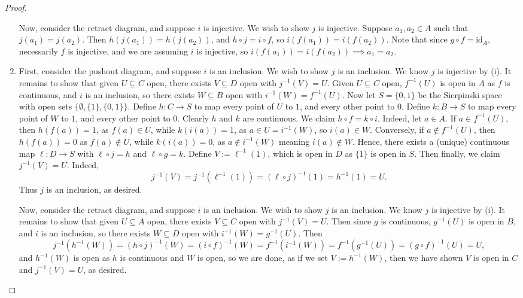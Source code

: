 \documentclass{amsart}
\theoremstyle{plain}
\theoremstyle{definition}
\newcommand{\sseq}{\subseteq}
\newcommand{\0}{\mathbf{0}}
\newcommand{\id}{\mathrm{id}}
\renewcommand{\(}{\left(}
\renewcommand{\)}{\right)}
\begin{document}
\begin{proof}
\begin{enumerate}[label=(\roman*),listparindent=\parindent,parsep=0pt]
    Now, consider the retract diagram, and suppose $i$ is injective. We wish to show $j$ is injective. Suppose $a_1,a_2\in A$ such that $j(a_1)=j(a_2)$. Then $h(j(a_1))=h(j(a_2))$, and $h\circ j=i\circ f$, so $i(f(a_1))=i(f(a_2))$. Note that since $g\circ f=\id_A$, necessarily $f$ is injective, and we are assuming $i$ is injective, so $i(f(a_1))=i(f(a_2))\implies a_1=a_2$.
    \item First, consider the pushout diagram, and suppose $i$ is an inclusion. We wish to show $j$ is an inclusion. We know $j$ is injective by (i). It remains to show that given $U\sseq C$ open, there exists $V\sseq D$ open with $j^{-1}(V)=U$. Given $U\sseq C$ open, $f^{-1}(U)$ is open in $A$ as $f$ is continuous, and $i$ is an inclusion, so there exists $W\sseq B$ open with $i^{-1}(W)=f^{-1}(U)$. Now let $S=\{0,1\}$ be the Sierpinski space with open sets $\{\emptyset,\{1\},\{0,1\}\}$. Define $ h:C\to S$ to map every point of $U$ to $1$, and every other point to $0$. Define $ k:B\to S$ to map every point of $W$ to $1$, and every other point to $0$. Clearly $ h$ and $ k$ are continuous. We claim $ h\circ f= k\circ i$. Indeed, let $a\in A$. If $a\in f^{-1}(U)$, then $ h(f(a))=1$, as $f(a)\in U$, while $ k(i(a))=1$, as $a\in U=i^{-1}(W)$, so $i(a)\in W$. Conversely, if $a\notin f^{-1}(U)$, then $ h(f(a))=0$ as $f(a)\notin U$, while $ k(i(a))=0$, as $a\notin i^{-1}(W)$ meaning $i(a)\notin W$. Hence, there exists a (unique) continuous map $\ell:D\to S$ with $\ell\circ j=h$ and $\ell\circ g=k$. Define $V:=\ell^{-1}(1)$, which is open in $D$ as $\{1\}$ is open in $S$. Then finally, we claim $j^{-1}(V)=U$. Indeed,
    \[j^{-1}(V)=j^{-1}(\ell^{-1}(1))=(\ell\circ j)^{-1}(1)=h^{-1}(1)=U.\]
    Thus $j$ is an inclusion, as desired.
    
    Now, consider the retract diagram, and suppose $i$ is an inclusion. We wish to show $j$ is an inclusion. We know $j$ is injective by (i). It remains to show that given $U\sseq A$ open, there exists $V\sseq C$ open with $j^{-1}(V)=U$. Then since $g$ is continuous, $g^{-1}(U)$ is open in $B$, and $i$ is an inclusion, so there exists $W\sseq D$ open with $i^{-1}(W)=g^{-1}(U)$. Then 
    \[j^{-1}(h^{-1}(W))=(h\circ j)^{-1}(W)=(i\circ f)^{-1}(W)= f^{-1}(i^{-1}(W))= f^{-1}(g^{-1}(U))=(g\circ f)^{-1}(U)=U,\]
    and $h^{-1}(W)$ is open as $h$ is continuous and $W$ is open, so we are done, as if we set $V:=h^{-1}(W)$, then we have shown $V$ is open in $C$ and $j^{-1}(V)=U$, as desired.


\end{enumerate}
\end{proof}
\end{document}
